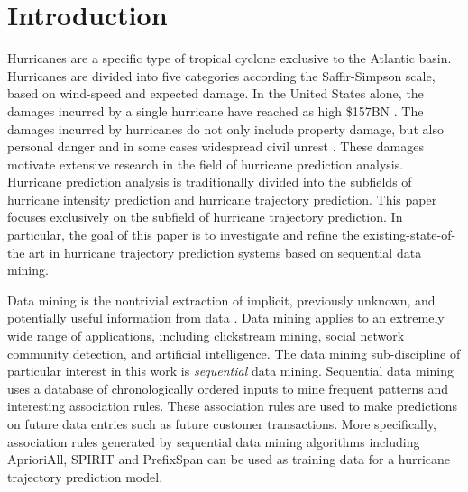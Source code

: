 \documentclass[12pt,conference]{IEEEtran}
\begin{document}
\IEEEpeerreviewmaketitle

\section{Introduction}

Hurricanes are a specific type of tropical cyclone exclusive to the Atlantic basin. Hurricanes are divided into five categories according the Saffir-Simpson scale, based on wind-speed and expected damage. In the United States alone, the damages incurred by a single hurricane have reached as high \$157BN \cite{hurricane-cost}. The damages incurred by hurricanes do not only include property damage, but also personal danger and in some cases widespread civil unrest \cite{hurricane-cost-non-financial}. These damages motivate extensive research in the field of hurricane prediction analysis. Hurricane prediction analysis is traditionally divided into the subfields of hurricane intensity prediction and hurricane trajectory prediction. This paper focuses exclusively on the subfield of hurricane trajectory prediction. In particular, the goal of this paper is to investigate and refine the existing-state-of-the art in hurricane trajectory prediction systems based on sequential data mining.

Data mining is the nontrivial extraction of implicit, previously unknown, and potentially useful information from data \cite{data mining-def}. Data mining applies to an extremely wide range of applications, including clickstream mining, social network community detection, and artificial intelligence. The data mining sub-discipline of particular interest in this work is \textit{sequential} data mining. Sequential data mining uses a database of chronologically ordered inputs to mine frequent patterns and interesting association rules. These association rules are used to make predictions on future data entries such as future customer transactions. More specifically, association rules generated by sequential data mining algorithms including AprioriAll, SPIRIT and PrefixSpan can be used as training data for a hurricane trajectory prediction model.
\end{document}
